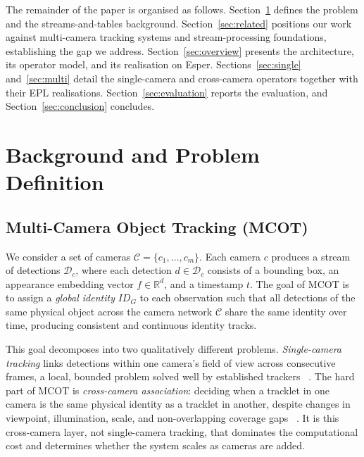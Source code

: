 \documentclass[review]{elsarticle}
\begin{document}
The remainder of the paper is organised as follows. Section~\ref{sec:background} defines the
problem and the streams-and-tables background. Section~\ref{sec:related} positions our work
against multi-camera tracking systems and stream-processing foundations, establishing the gap
we address. Section~\ref{sec:overview} presents the architecture, its operator model, and its
realisation on Esper. Sections~\ref{sec:single} and~\ref{sec:multi} detail the single-camera
and cross-camera operators together with their EPL realisations.
Section~\ref{sec:evaluation} reports the evaluation, and Section~\ref{sec:conclusion}
concludes.

\section{Background and Problem Definition}\label{sec:background}

\subsection{Multi-Camera Object Tracking (MCOT)}
\label{sec:background:mcot}

We consider a set of cameras $\mathcal{C} = \{c_1,\dots,c_m\}$. Each camera $c$ produces a stream of detections $\mathcal{D}_c$, where each detection $d \in \mathcal{D}_c$ consists of a bounding box, an appearance embedding vector $f \in \mathbb{R}^{d}$, and a timestamp $t$. The goal of MCOT is to assign a \emph{global identity} $ID_G$ to each observation such that all detections of the same physical object across the camera network $\mathcal{C}$ share the same identity over time, producing consistent and continuous identity tracks.

This goal decomposes into two qualitatively different problems. \emph{Single-camera tracking} links detections within one camera's field of view across consecutive frames, a local, bounded problem solved well by established trackers~\cite{Bewley2016_sort,Wojke2017_deepsort,zhang2022bytetrack} %
. The hard part of MCOT is \emph{cross-camera association}: deciding when a tracklet in one camera is the same physical identity as a tracklet in another, despite changes in viewpoint, illumination, scale, and non-overlapping coverage gaps~\cite{ye2021deep,ristani2016performance} %
. It is this cross-camera layer, not single-camera tracking, that dominates the computational cost and determines whether the system scales as cameras are added.
\end{document}
